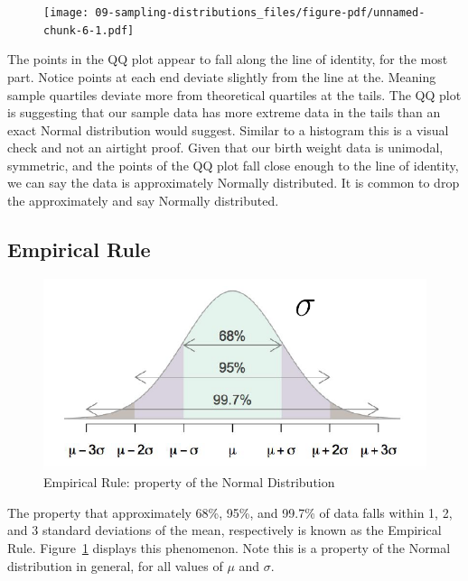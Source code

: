 \documentclass[
  letterpaper,
  DIV=11,
  numbers=noendperiod]{scrreprt}
\theoremstyle{definition}
\theoremstyle{remark}
\begin{document}
\begin{figure}[H]

{\centering \texttt{[image: 09-sampling-distributions\_files/figure-pdf/unnamed-chunk-6-1.pdf]}

}

\end{figure}

The points in the QQ plot appear to fall along the line of identity, for
the most part. Notice points at each end deviate slightly from the line
at the. Meaning sample quartiles deviate more from theoretical quartiles
at the tails. The QQ plot is suggesting that our sample data has more
extreme data in the tails than an exact Normal distribution would
suggest. Similar to a histogram this is a visual check and not an
airtight proof. Given that our birth weight data is unimodal, symmetric,
and the points of the QQ plot fall close enough to the line of identity,
we can say the data is approximately Normally distributed. It is common
to drop the approximately and say Normally distributed.

\hypertarget{empirical-rule}{%
\subsection{Empirical Rule}\label{empirical-rule}}

\begin{figure}

{\centering \includegraphics{images/empirical_rule.png}

}

\caption{\label{fig-empirical-rule2}Empirical Rule: property of the
Normal Distribution}

\end{figure}

The property that approximately 68\%, 95\%, and 99.7\% of data falls
within 1, 2, and 3 standard deviations of the mean, respectively is
known as the Empirical Rule. Figure~\ref{fig-empirical-rule2} displays
this phenomenon. Note this is a property of the Normal distribution in
general, for all values of \(\mu\) and \(\sigma\).
\end{document}
